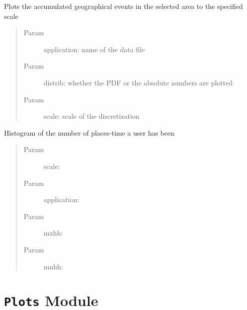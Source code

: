 \documentclass[letterpaper,10pt,english]{sphinxmanual}
\begin{document}

\begin{fulllineitems}
\label{index:SuperHub.Descriptive.plot_accumulated_events}
Plots the accumulated geographical events in the selected area to the
specified scale
\begin{quote}\begin{description}
\item[{Param }] \leavevmode
application: name of the data file

\item[{Param }] \leavevmode
distrib: whether the PDF or the absolute numbers are plotted

\item[{Param }] \leavevmode
scale: scale of the discretization

\end{description}\end{quote}

\end{fulllineitems}


\begin{fulllineitems}
\label{index:SuperHub.Descriptive.user_events_histogram}
Histogram of the number of places-time a user has been
\begin{quote}\begin{description}
\item[{Param }] \leavevmode
scale:

\item[{Param }] \leavevmode
application:

\item[{Param }] \leavevmode
mxhh:

\item[{Param }] \leavevmode
mnhh:

\end{description}\end{quote}

\end{fulllineitems}



\chapter{\texttt{Plots} Module}
\label{index:plots-module}\label{index:module-SuperHub.Plots}\label{index:module-SuperHub.Plot}
\end{document}

